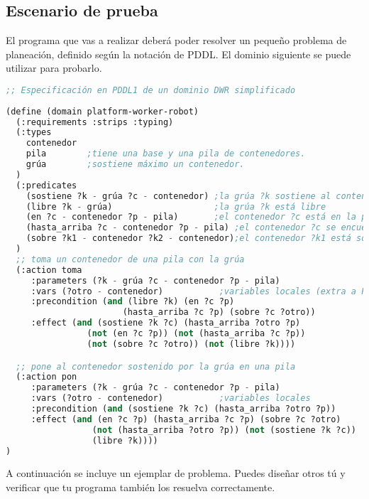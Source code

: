 \subsection{Escenario de prueba}

El programa que vas a realizar deberá poder resolver un pequeño problema de planeación, definido según la notación de PDDL.  El dominio siguiente se puede utilizar para probarlo.

\begin{lstlisting}[language=Lisp]
;; Especificación en PDDL1 de un dominio DWR simplificado
 
(define (domain platform-worker-robot)
  (:requirements :strips :typing)
  (:types
    contenedor
    pila	    ;tiene una base y una pila de contenedores.
    grúa	    ;sostiene máximo un contenedor.
  )
  (:predicates
    (sostiene ?k - grúa ?c - contenedor) ;la grúa ?k sostiene al contenedor ?c
    (libre ?k - grúa)                    ;la grúa ?k está libre
    (en ?c - contenedor ?p - pila)       ;el contenedor ?c está en la pila ?p
    (hasta_arriba ?c - contenedor ?p - pila) ;el contenedor ?c se encuentra hasta arriba de la pila ?p
    (sobre ?k1 - contenedor ?k2 - contenedor);el contenedor ?k1 está sobre el contenedor ?k2
  )
  ;; toma un contenedor de una pila con la grúa
  (:action toma
     :parameters (?k - grúa ?c - contenedor ?p - pila)
     :vars (?otro - contenedor)           ;variables locales (extra a PDDL)
     :precondition (and (libre ?k) (en ?c ?p) 
                       (hasta_arriba ?c ?p) (sobre ?c ?otro))
     :effect (and (sostiene ?k ?c) (hasta_arriba ?otro ?p)
                (not (en ?c ?p)) (not (hasta_arriba ?c ?p))
                (not (sobre ?c ?otro)) (not (libre ?k))))

  ;; pone al contenedor sostenido por la grúa en una pila
  (:action pon                                 
     :parameters (?k - grúa ?c - contenedor ?p - pila)
     :vars (?otro - contenedor)           ;variables locales
     :precondition (and (sostiene ?k ?c) (hasta_arriba ?otro ?p))
     :effect (and (en ?c ?p) (hasta_arriba ?c ?p) (sobre ?c ?otro)
                 (not (hasta_arriba ?otro ?p)) (not (sostiene ?k ?c))
                 (libre ?k))))
)
\end{lstlisting}

A continuación se incluye un ejemplar de problema.  Puedes diseñar otros tú y verificar que tu programa también los resuelva correctamente.


